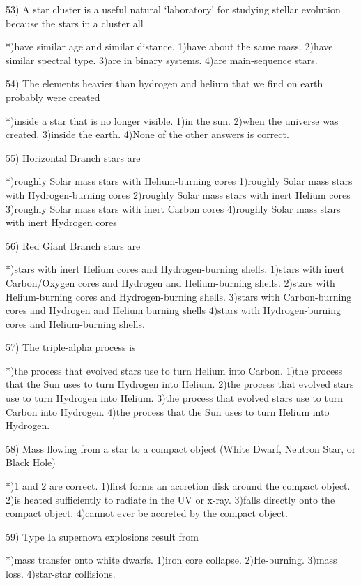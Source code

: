 53) A star cluster is a useful natural `laboratory' for studying stellar
    evolution because the stars in a cluster all
 
 *)have similar age and similar distance.
 1)have about the same mass.
 2)have similar spectral type.
 3)are in binary systems.
 4)are main-sequence stars.
 
54) The elements heavier than hydrogen and helium that we find on earth
    probably were created
 
 *)inside a star that is no longer visible.
 1)in the sun.
 2)when the universe was created.
 3)inside the earth.
 4)None of the other answers is correct.
 
55) Horizontal Branch stars are
 
 *)roughly Solar mass stars with Helium-burning cores
 1)roughly Solar mass stars with Hydrogen-burning cores
 2)roughly Solar mass stars with inert Helium cores
 3)roughly Solar mass stars with inert Carbon cores
 4)roughly Solar mass stars with inert Hydrogen cores
 
56) Red Giant Branch stars are
 
 *)stars with inert Helium cores and Hydrogen-burning shells.
 1)stars with inert Carbon/Oxygen cores and Hydrogen and Helium-burning 
   shells.
 2)stars with Helium-burning cores and Hydrogen-burning shells.
 3)stars with Carbon-burning cores and Hydrogen and Helium burning shells
 4)stars with Hydrogen-burning cores and Helium-burning shells.
 
57) The triple-alpha process is
 
 *)the process that evolved stars use to turn Helium into Carbon.
 1)the process that the Sun uses to turn Hydrogen into Helium.
 2)the process that evolved stars use to turn Hydrogen into Helium.
 3)the process that evolved stars use to turn Carbon into Hydrogen.
 4)the process that the Sun uses to turn Helium into Hydrogen.
 
58) Mass flowing from a star to a compact object (White Dwarf, Neutron
    Star, or Black Hole)
 
 *)1 and 2 are correct.
 1)first forms an accretion disk around the compact object.
 2)is heated sufficiently to radiate in the UV or x-ray.
 3)falls directly onto the compact object.
 4)cannot ever be accreted by the compact object.
 
59) Type Ia supernova explosions result from
 
 *)mass transfer onto white dwarfs.
 1)iron core collapse.
 2)He-burning.
 3)mass loss.
 4)star-star collisions.
 
